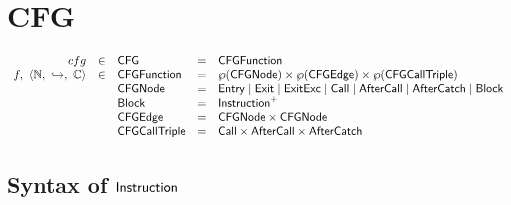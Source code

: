 \chapter{CFG}
\[
\begin{array}{rllll}
cfg & \in & \mbox{\textsf{CFG}} & = & \mbox{\textsf{CFGFunction}} \\
f,\ \langle \mathbb{N},\ \hookrightarrow,\ \mathbb{C} \rangle & \in & \mbox{\textsf{CFGFunction}} & = & \wp(\mbox{\textsf{CFGNode}}) \times \wp(\mbox{\textsf{CFGEdge}}) \times \wp(\mbox{\textsf{CFGCallTriple}}) \\
& & \mbox{\textsf{CFGNode}} & = & \mbox{\textsf{Entry}} \mid \mbox{\textsf{Exit}} \mid \mbox{\textsf{ExitExc}} \mid \mbox{\textsf{Call}} \mid \mbox{\textsf{AfterCall}} \mid \mbox{\textsf{AfterCatch}} \mid \mbox{\textsf{Block}} \\
& & \mbox{\textsf{Block}} & = & \mbox{\textsf{Instruction}}^+ \\
& & \mbox{\textsf{CFGEdge}} & = & \mbox{\textsf{CFGNode}} \times \mbox{\textsf{CFGNode}} \\
& & \mbox{\textsf{CFGCallTriple}} & = & \mbox{\textsf{Call}} \times \mbox{\textsf{AfterCall}} \times \mbox{\textsf{AfterCatch}}\\
\end{array}
\]

\section{Syntax of $\mbox{\textsf{Instruction}}$}

